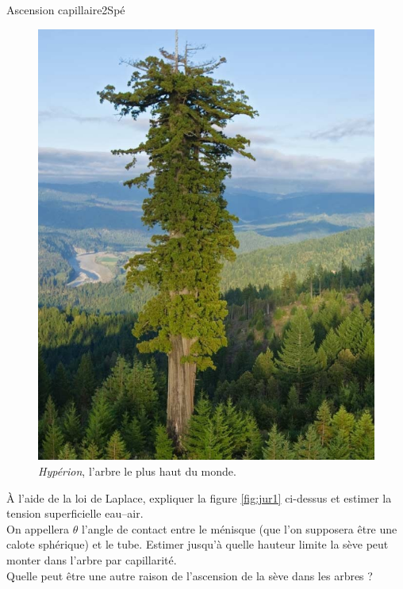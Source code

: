 \begin{exercise}{Ascension capillaire}{2}{Spé}
\begin{questions}
\begin{EnvUplevel}
\begin{multicols}{2}
\begin{figure}[H]
    \includegraphics[width=\linewidth]{mecaflu/jurin2.png}
    \vspace{-1em}
    \caption{\emph{Hypérion}, l'arbre le plus haut du monde.}\label{fig:jur2}
\end{figure}
\end{multicols}

\end{EnvUplevel}
    \question \`A l'aide de la loi de Laplace, expliquer la figure \ref{fig:jur1} ci-dessus et estimer la tension superficielle eau--air. \\
    On appellera $\theta$ l'angle de contact entre le ménisque (que l'on supposera être une calote sphérique) et le tube.
    \question Estimer jusqu'à quelle hauteur limite la sève peut monter dans l'arbre par capillarité. \\
    Quelle peut être une autre raison de l'ascension de la sève dans les arbres ?
\end{questions}
\end{exercise}